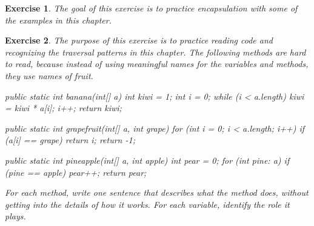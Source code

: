 \documentclass[12pt]{book}
\theoremstyle{exercise}
\newtheorem{exercise}{Exercise}[chapter]
\newcommand{\java}{\verb}%}
\begin{document}
\begin{exercise}
The goal of this exercise is to practice encapsulation with some of the examples in this chapter.


\end{exercise}


\begin{exercise}
The purpose of this exercise is to practice reading code and recognizing the traversal patterns in this chapter.
The following methods are hard to read, because instead of using meaningful names for the variables and methods, they use names of fruit.

\begin{code}
public static int banana(int[] a) {
    int kiwi = 1;
    int i = 0;
    while (i < a.length) {
        kiwi = kiwi * a[i];
        i++;
    }
    return kiwi;
}
\end{code}

\begin{code}
public static int grapefruit(int[] a, int grape) {
    for (int i = 0; i < a.length; i++) {
        if (a[i] == grape) {
            return i;
        }
    }
    return -1;
}
\end{code}

\begin{code}
public static int pineapple(int[] a, int apple) {
    int pear = 0;
    for (int pine: a) {
        if (pine == apple) {
            pear++;
        }
    }
    return pear;
}
\end{code}

For each method, write one sentence that describes what the method does, without getting into the details of how it works.
For each variable, identify the role it plays.

\end{exercise}
\end{document}
